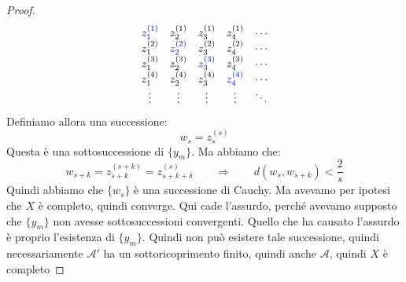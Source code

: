 \documentclass[11pt,a4paper,twoside]{article}
\theoremstyle{definition}
\begin{document}
\begin{proof}
	\[\begin{matrix}
		{\color{blue} z_1^{(1)}} & z_2^{(1)} & z_3^{(1)} & z_4^{(1)} & \cdots\\
		z_1^{(2)} & {\color{blue} z_2^{(2)}} & z_3^{(2)} & z_4^{(2)} & \cdots\\
		z_1^{(3)} & z_2^{(3)} & {\color{blue} z_3^{(3)}} & z_4^{(3)} & \cdots\\
		z_1^{(4)} & z_2^{(4)} & z_3^{(4)} & {\color{blue} z_4^{(4)}} & \cdots\\
		\vdots & \vdots & \vdots & \vdots & {\color{blue} \ddots}
	\end{matrix}\]
	Definiamo allora una successione:
	\[ w_s = z^{(s)}_s \]
	Questa è una sottosuccessione di $\{y_m\}$. Ma abbiamo che:
	\[ w_{s+k} = z^{(s+k)}_{s+k} = z^{(s)}_{s+k+\delta} \qquad 	\Rightarrow \qquad d(w_s, w_{s+k})< \frac 2s\]
	Quindi abbiamo che $\{w_s\}$ è una successione di Cauchy. Ma avevamo per ipotesi che $X$ è completo, quindi converge. Qui cade l'assurdo, perché avevamo supposto che $\{y_m\}$ non avesse sottosuccessioni convergenti. Quello che ha causato l'assurdo è proprio l'esistenza di $\{y_m\}$. Quindi non può esistere tale successione, quindi necessariamente $\mathcal A'$ ha un sottoricoprimento finito, quindi anche $\mathcal A$, quindi $X$ è completo
\end{proof}
\end{document}
